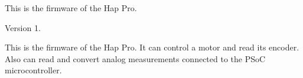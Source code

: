 This is the firmware of the Hap Pro. \begin{DoxyVersion}{Version}
1.
\end{DoxyVersion}
This is the firmware of the Hap Pro. It can control a motor and read its encoder. Also can read and convert analog measurements connected to the P\+SoC microcontroller. 